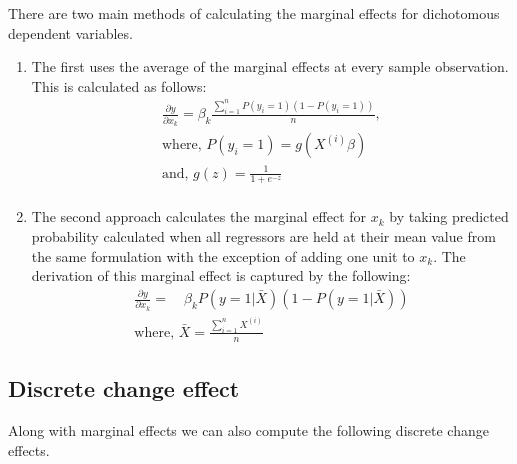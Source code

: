 There are two main methods of calculating the marginal effects for dichotomous
dependent variables.
\begin{enumerate}
  \item The first uses the average of the marginal effects at every sample
  observation. This is calculated as follows:
  \begin{gather*}
    \frac{\partial y}{\partial x_k} = \beta_k \frac{\sum_{i=1}^{n} P(y_i = 1)(1-P(y_i = 1))}{n}, \\
    \text{where, } P(y_i=1) = g(X^{(i)} \beta) \\
    \text{and, } g(z) = \frac{1}{1 + e^{-z}} \\
  \end{gather*}

  \item The second approach calculates the marginal effect for $x_k$ by taking
    predicted probability calculated when all regressors are held at their mean
    value from the same formulation with the exception of adding one unit to $x_k$.
    The derivation of this marginal effect is captured by the following:
    \begin{gather*}
      \frac{\partial y}{\partial x_k} = \quad \beta_k P(y=1|\bar{X})(1-P(y=1|\bar{X})) \\
      \text{where, } \bar{X} = \frac{\sum_{i=1}^{n}X^{(i)}}{n}
    \end{gather*}
\end{enumerate}

\subsection{Discrete change effect} %
\label{sub:discrete_change_effect}
Along with marginal effects we can also compute the following discrete change
effects.

